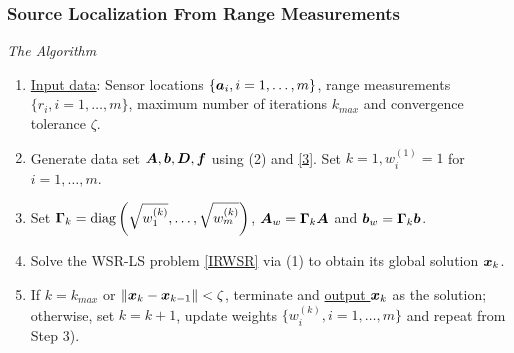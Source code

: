 
\begin{frame}
\frametitle{Source Localization From Range Measurements}
{\large \textit{The Algorithm}} \\
\normalsize
\begin{enumerate}
\item %
\underline{Input data}: Sensor locations $\{\mbox{\boldmath$a$}_i, i=1,\ldots,m\}$, range measurements $\{r_i, i=1,\ldots,m\}$, maximum number of iterations $k_{max}$ and convergence tolerance $\zeta$.
\item %
Generate data set $\mbox{\boldmath$A$},\mbox{\boldmath$b$}, \mbox{\boldmath$D$}, \mbox{\boldmath$f$}$ using (2) and \eqref{3}. Set $k=1, w_i^{(1)}=1$ for $i=1,\ldots,m$.
\item %
Set $\mbox{\boldmath{$\Gamma$}}_k=\mbox{diag}\left(\sqrt{w_1^{(k)}},\ldots,\sqrt{w_m^{(k)}}\right)$, $\mbox{\boldmath$A$}_w=\mbox{\boldmath{$\Gamma$}}_k\mbox{\boldmath$A$}$ and $\mbox{\boldmath$b$}_w=\mbox{\boldmath{$\Gamma$}}_k\mbox{\boldmath$b$}$.
\item%
Solve the WSR-LS problem \eqref{IRWSR}  via (1) to obtain its global solution $\mbox{\boldmath$x$}_k$. %
\item %
If $k=k_{max}$ or $\|\mbox{\boldmath$x$}_k-\mbox{\boldmath$x$}_{k-1}\|<\zeta$, terminate and \underline{output $\mbox{\boldmath$x$}_k$} as the solution; otherwise, set $k=k+1$, update weights $\{w_i^{(k)}, i=1,\ldots,m\}$ and repeat from Step 3).
\end{enumerate}
\end{frame}

